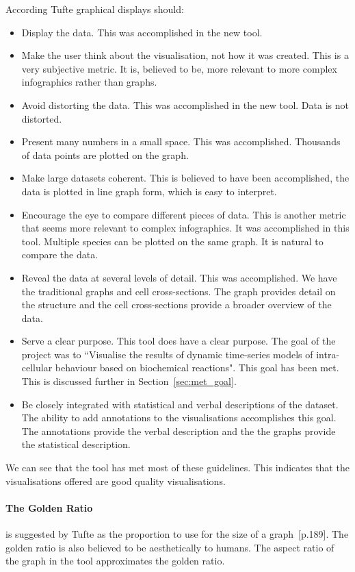 According Tufte graphical displays should:
\begin{itemize}
\item Display the data.  This was accomplished in the new tool.
\item Make the user think about the visualisation, not how it was created.  This is a very subjective metric.  It is, believed to be, more relevant to more complex infographics rather than graphs.
\item Avoid distorting the data.  This was accomplished in the new tool.  Data is not distorted.
\item Present many numbers in a small space.  This was accomplished.  Thousands of data points are plotted on the graph.
\item Make large datasets coherent.  This is believed to have been accomplished, the data is plotted in line graph form, which is easy to interpret.
\item Encourage the eye to compare different pieces of data.  This is another metric that seems more relevant to complex infographics.  It was accomplished in this tool.  Multiple species can be plotted on the same graph.  It is natural to compare the data.
\item Reveal the data at several levels of detail.  This was accomplished.
We have the traditional graphs and cell cross-sections.  The graph provides detail on the structure and the cell cross-sections provide a broader overview of the data.
\item Serve a clear purpose.  This tool does have a clear purpose. The goal of the project was to ``Visualise the results of dynamic time-series models of intra-cellular behaviour based on biochemical reactions".  This goal has been met.  This is discussed further in Section~\ref{sec:met_goal}.
\item Be closely integrated with statistical and verbal descriptions of the dataset.  The ability to add annotations to the visualisations accomplishes this goal.  The annotations provide the verbal description and the the graphs provide the statistical description.
\end{itemize}

We can see that the tool has met most of these guidelines.  This indicates that the visualisations offered are good quality visualisations.

\paragraph*{The Golden Ratio} is suggested by Tufte as the proportion to use for the size of a graph~\cite{tufte}[p.189].  The golden ratio is also believed to be aesthetically to humans.  The aspect ratio of the graph in the tool approximates the golden ratio.

